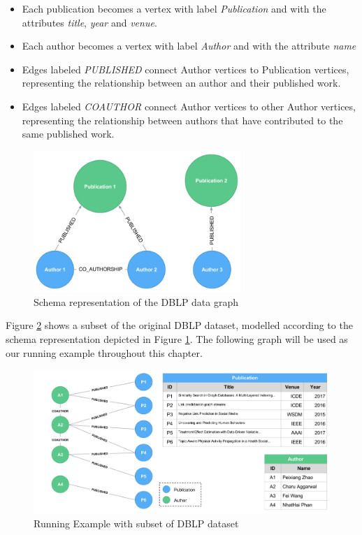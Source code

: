 \begin{itemize}
\item Each publication becomes a vertex with label \emph{Publication} and with the attributes \emph{title}, \emph{year} and \emph{venue}.
\item Each author becomes a vertex with label \emph{Author} and with the attribute \emph{name}
\item Edges labeled \emph{PUBLISHED} connect Author vertices to Publication vertices, representing the relationship between an author and their published work.
\item Edges labeled \emph{COAUTHOR} connect Author vertices to other Author vertices, representing the relationship between authors that have contributed to the same published work.
\end{itemize}

\begin{figure}[ht]
\centering
\includegraphics[width=0.7\textwidth]{../dblp_schema.png}
\caption{Schema representation of the DBLP data graph}
\label{fig:figure25}
\end{figure}

Figure \ref{fig:figure26} shows a subset of the original DBLP dataset, modelled according to the schema representation depicted in Figure \ref{fig:figure25}. The following graph will be used as our running example throughout this chapter.

\begin{figure}[ht]
\centering
\includegraphics[width=1\textwidth]{../running_example.png}
\caption{Running Example with subset of DBLP dataset}
\label{fig:figure26}
\end{figure}

